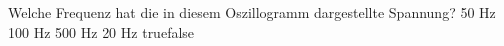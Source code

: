     {Welche Frequenz hat die in diesem Oszillogramm dargestellte Spannung?}
    {50 Hz}
    {100 Hz}
    {500 Hz}
    {20 Hz}
    {true}{false}